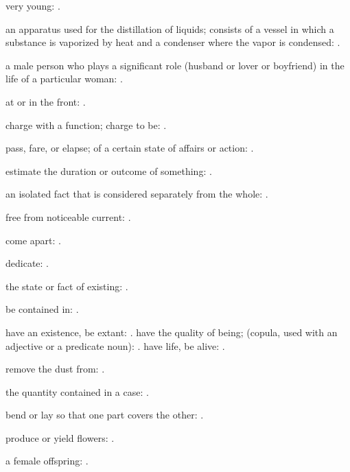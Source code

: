  very young: .

  an apparatus used for the distillation of liquids; consists of a vessel in which a substance is vaporized by heat and a condenser where the vapor is condensed: .

  a male person who plays a significant role (husband or lover or boyfriend) in the life of a particular woman: .

  at or in the front: .

  charge with a function; charge to be:   .

  pass, fare, or elapse; of a certain state of affairs or action: .

  estimate the duration or outcome of something: .

  an isolated fact that is considered separately from the whole:   .

  free from noticeable current: .

  come apart:   .

  dedicate:   .

  the state or fact of existing: .

  be contained in: .

  have an existence, be extant:   . have the quality of being; (copula, used with an adjective or a predicate noun): . have life, be alive:   .

  remove the dust from: .

  the quantity contained in a case:   .

  bend or lay so that one part covers the other:   .

  produce or yield flowers:   .

  a female offspring: .

